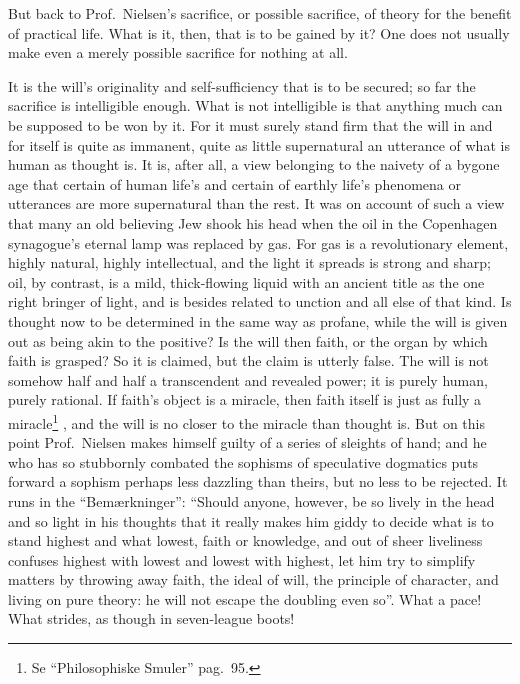 \documentclass[12pt,a4paper]{book}
\renewcommand{\thefootnote}{*)}
\newcommand{\fnmark}[2]{\renewcommand{\thefootnote}{#1}\footnote{#2}%
  \renewcommand{\thefootnote}{*)}}
\newcommand{\opage}[1]{\marginnote{\footnotesize\textit{[#1]}}}
\begin{document}
But back to Prof.\ Nielsen's sacrifice, or possible sacrifice, of theory for
the benefit of practical life. What is it, then, that is to be gained by it?
One does not usually make even a merely possible sacrifice for nothing at all.

It is the will's originality and self-sufficiency that is to be secured; so far
the sacrifice is intelligible enough. What is not intelligible is that anything
much can be supposed to be won by it. For it must surely stand firm that the
will in and for itself is
\opage{72}quite as immanent, quite as little supernatural an utterance of what
is human as thought is. It is, after all, a view belonging to the naivety of a
bygone age that certain of human life's and certain of earthly life's phenomena
or utterances are more supernatural than the rest. It was on account of such a
view that many an old believing Jew shook his head when the oil in the
Copenhagen synagogue's eternal lamp was replaced by gas. For gas is a
revolutionary element, highly natural, highly intellectual, and the light it
spreads is strong and sharp; oil, by contrast, is a mild, thick-flowing liquid
with an ancient title as the one right bringer of light, and is besides related
to unction and all else of that kind. Is thought now to be determined in the
same way as profane, while the will is given out as being akin to the positive?
Is the will then faith, or the organ by which faith is grasped? So it is
claimed, but the claim is utterly false. The will is not somehow half and half
a transcendent and revealed power; it is purely human, purely rational. If
faith's object is a miracle, then faith itself is just as fully a
miracle\fnmark{*)}{Se ``Philosophiske Smuler'' pag.\ 95.}, and the will is no
closer to the miracle than thought is. But on this point Prof.\ Nielsen makes
himself guilty of a series of sleights of hand; and he who has so stubbornly
combated the sophisms of speculative dogmatics puts forward a
\opage{73}sophism perhaps less dazzling than theirs, but no less to be
rejected. It runs in the ``Bemærkninger'': ``Should anyone, however, be so
lively in the head and so light in his thoughts that it really makes him giddy
to decide what is to stand highest and what lowest, faith or knowledge, and out
of sheer liveliness confuses highest with lowest and lowest with highest, let
him try to simplify matters by throwing away faith, the ideal of will, the
principle of character, and living on pure theory: he will not escape the
doubling even so''. What a pace! What strides, as though in seven-league boots!
\end{document}
